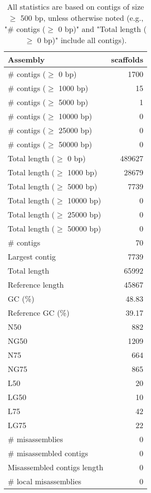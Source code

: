 \documentclass[12pt,a4paper]{article}
\begin{document}
\begin{table}[ht]
\begin{center}
\caption{All statistics are based on contigs of size $\geq$ 500 bp, unless otherwise noted (e.g., "\# contigs ($\geq$ 0 bp)" and "Total length ($\geq$ 0 bp)" include all contigs).}
\begin{tabular}{|l*{1}{|r}|}
\hline
Assembly & scaffolds \\ \hline
\# contigs ($\geq$ 0 bp) & 1700 \\ \hline
\# contigs ($\geq$ 1000 bp) & 15 \\ \hline
\# contigs ($\geq$ 5000 bp) & 1 \\ \hline
\# contigs ($\geq$ 10000 bp) & 0 \\ \hline
\# contigs ($\geq$ 25000 bp) & 0 \\ \hline
\# contigs ($\geq$ 50000 bp) & 0 \\ \hline
Total length ($\geq$ 0 bp) & 489627 \\ \hline
Total length ($\geq$ 1000 bp) & 28679 \\ \hline
Total length ($\geq$ 5000 bp) & 7739 \\ \hline
Total length ($\geq$ 10000 bp) & 0 \\ \hline
Total length ($\geq$ 25000 bp) & 0 \\ \hline
Total length ($\geq$ 50000 bp) & 0 \\ \hline
\# contigs & 70 \\ \hline
Largest contig & 7739 \\ \hline
Total length & 65992 \\ \hline
Reference length & 45867 \\ \hline
GC (\%) & 48.83 \\ \hline
Reference GC (\%) & 39.17 \\ \hline
N50 & 882 \\ \hline
NG50 & 1209 \\ \hline
N75 & 664 \\ \hline
NG75 & 865 \\ \hline
L50 & 20 \\ \hline
LG50 & 10 \\ \hline
L75 & 42 \\ \hline
LG75 & 22 \\ \hline
\# misassemblies & 0 \\ \hline
\# misassembled contigs & 0 \\ \hline
Misassembled contigs length & 0 \\ \hline
\# local misassemblies & 0 \\ \hline

\end{tabular}
\end{center}
\end{table}
\end{document}
